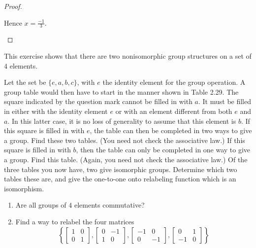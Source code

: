 \begin{proof}
\begin{enumerate}[label={\textbf{\alph*.}}]
              Hence $x = \frac{-1}{3}$.
    \end{enumerate}
\end{proof}

\begin{exercise}
    This exercise shows that there are two nonisomorphic group structures on a set of $4$ elements.

    Let the set be $\{ e, a, b, c \}$, with $e$ the identity element for the group operation. A group table would then have to start in the manner shown in Table 2.29. The square indicated by the question mark cannot be filled in with $a$. It must be filled in either with the identity element $e$ or with an element different from both $e$ and $a$. In this latter case, it is no loss of generality to assume that this element is $b$. If this square is filled in with $e$, the table can then be completed in two ways to give a group. Find these two tables. (You need not check the associative law.) If this square is filled in with $b$, then the table can only be completed in one way to give a group. Find this table. (Again, you need not check the associative law.) Of the three tables you now have, two give isomorphic groups. Determine which two tables these are, and give the one-to-one onto relabeling function which is an isomorphism.

    \begin{enumerate}[label={\textbf{\alph*}}]
        \item Are all groups of $4$ elements commutative?
        \item Find a way to relabel the four matrices
              \[
                  \left\{\begin{bmatrix}
                      1 & 0 \\
                      0 & 1
                  \end{bmatrix},
                  \begin{bmatrix}
                      0 & -1 \\
                      1 & 0
                  \end{bmatrix},
                  \begin{bmatrix}
                      -1 & 0  \\
                      0  & -1
                  \end{bmatrix},
                  \begin{bmatrix}
                      0  & 1 \\
                      -1 & 0
                  \end{bmatrix}\right\}
              \]


\end{enumerate}
\end{exercise}
